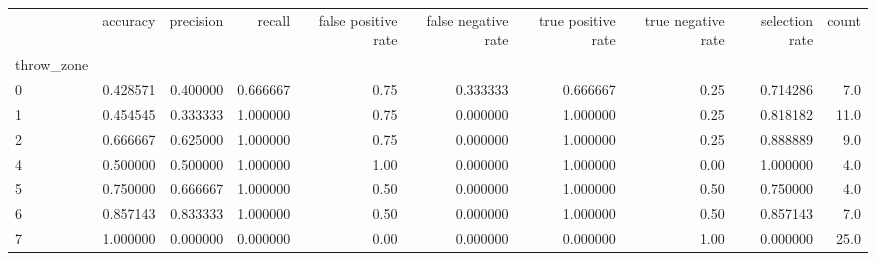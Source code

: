 \begin{tabular}{lrrrrrrrrr}
\toprule
{} &  accuracy &  precision &    recall &  false positive rate &  false negative rate &  true positive rate &  true negative rate &  selection rate &  count \\
throw\_zone &           &            &           &                      &                      &                     &                     &                 &        \\
\midrule
0          &  0.428571 &   0.400000 &  0.666667 &                 0.75 &             0.333333 &            0.666667 &                0.25 &        0.714286 &    7.0 \\
1          &  0.454545 &   0.333333 &  1.000000 &                 0.75 &             0.000000 &            1.000000 &                0.25 &        0.818182 &   11.0 \\
2          &  0.666667 &   0.625000 &  1.000000 &                 0.75 &             0.000000 &            1.000000 &                0.25 &        0.888889 &    9.0 \\
4          &  0.500000 &   0.500000 &  1.000000 &                 1.00 &             0.000000 &            1.000000 &                0.00 &        1.000000 &    4.0 \\
5          &  0.750000 &   0.666667 &  1.000000 &                 0.50 &             0.000000 &            1.000000 &                0.50 &        0.750000 &    4.0 \\
6          &  0.857143 &   0.833333 &  1.000000 &                 0.50 &             0.000000 &            1.000000 &                0.50 &        0.857143 &    7.0 \\
7          &  1.000000 &   0.000000 &  0.000000 &                 0.00 &             0.000000 &            0.000000 &                1.00 &        0.000000 &   25.0 \\
\bottomrule
\end{tabular}
